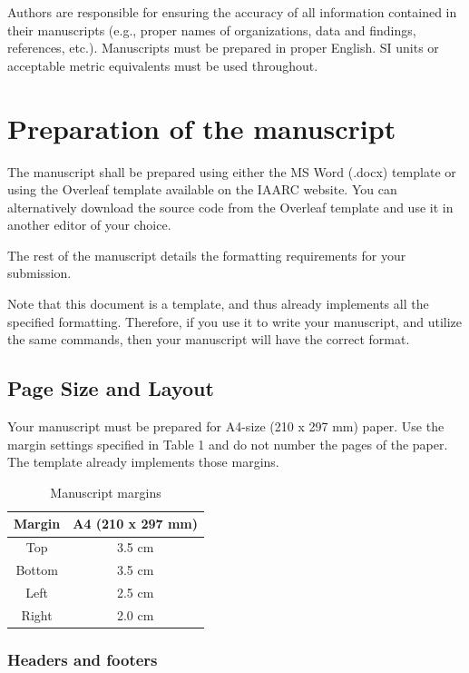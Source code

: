 \documentclass[a4paper, 10pt, twocolumn, twoside]{article}
\begin{document}
Authors are responsible for ensuring the accuracy of all information contained in their manuscripts (e.g., proper names of organizations, data and findings, references, etc.). Manuscripts must be prepared in proper English. SI units or acceptable metric equivalents must be used throughout.

\section{Preparation of the manuscript}
\label{sec:Preparation}


The manuscript shall be prepared using either the MS Word (.docx) template or  using the Overleaf template available on the IAARC website. You can alternatively download the source code from the Overleaf template and use it in another editor of your choice.

The rest of the manuscript details the formatting requirements for your submission.

Note that this document is a template, and thus already implements all the specified formatting. 
Therefore, if you use it to write your manuscript, and utilize the same commands, then your manuscript will have the correct format. 



\subsection{Page Size and Layout}

Your manuscript must be prepared for A4-size (210 x 297 mm) paper. 
Use the margin settings specified in Table 1 and do not number the pages of the paper.
The  template already implements those margins.

\begin{table}[htb!]
\centering
\caption{Manuscript margins}
\begin{tabular}{cc}
\hline
Margin	&A4 (210 x 297 mm)\\
\hline
Top		&3.5 cm\\
Bottom	&3.5 cm\\
Left	&2.5 cm\\
Right	&2.0 cm\\
\hline
\end{tabular}
\end{table}


\subsubsection{Headers and footers}
\end{document}
